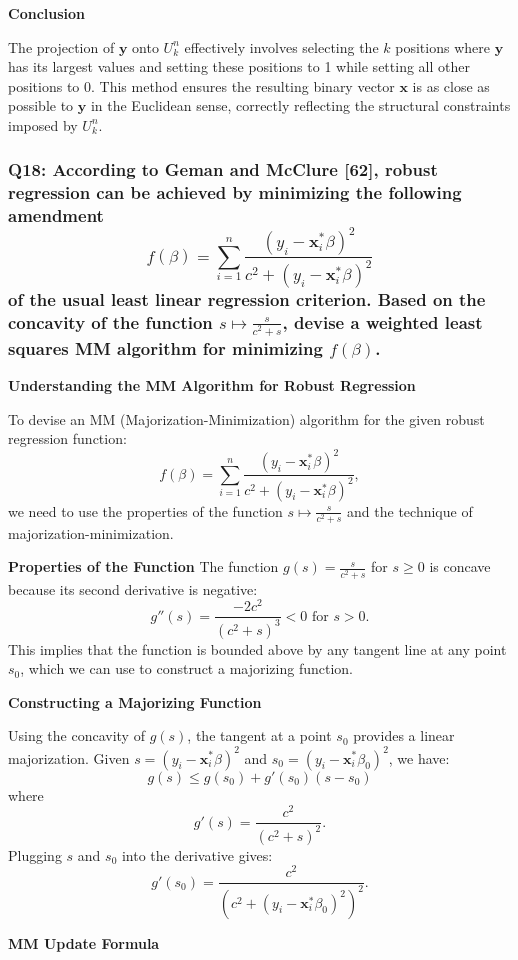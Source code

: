 \documentclass[8pt]{article}
\begin{document}
{\textbf{Conclusion}

The projection of \(\mathbf{y}\) onto \(U_k^n\) effectively involves selecting the \(k\) positions where \(\mathbf{y}\) has its largest values and setting these positions to 1 while setting all other positions to 0. This method ensures the resulting binary vector \(\mathbf{x}\) is as close as possible to \(\mathbf{y}\) in the Euclidean sense, correctly reflecting the structural constraints imposed by \( U_k^n \).


\subsubsection*{Q18: According to Geman and McClure [62], robust regression can be achieved by minimizing the following amendment
\[
f(\beta) = \sum_{i=1}^{n} \frac{(y_i - \mathbf{x}_i^* \beta)^2}{c^2 + (y_i - \mathbf{x}_i^* \beta)^2}
\]
of the usual least linear regression criterion. Based on the concavity of the function \(s \mapsto \frac{s}{c^2 + s}\), devise a weighted least squares MM algorithm for minimizing \(f(\beta)\).}

\textbf{Understanding the MM Algorithm for Robust Regression}

To devise an MM (Majorization-Minimization) algorithm for the given robust regression function:
\[ f(\beta) = \sum_{i=1}^{n} \frac{(y_i - \mathbf{x}_i^* \beta)^2}{c^2 + (y_i - \mathbf{x}_i^* \beta)^2}, \]
we need to use the properties of the function \(s \mapsto \frac{s}{c^2 + s}\) and the technique of majorization-minimization.

\textbf{Properties of the Function}
The function \(g(s) = \frac{s}{c^2 + s}\) for \(s \geq 0\) is concave because its second derivative is negative:
\[ g''(s) = \frac{-2c^2}{(c^2+s)^3} < 0 \text{ for } s > 0. \]
This implies that the function is bounded above by any tangent line at any point \(s_0\), which we can use to construct a majorizing function.

\textbf{Constructing a Majorizing Function}

Using the concavity of \(g(s)\), the tangent at a point \(s_0\) provides a linear majorization. Given \(s = (y_i - \mathbf{x}_i^* \beta)^2\) and \(s_0 = (y_i - \mathbf{x}_i^* \beta_0)^2\), we have:
\[ g(s) \leq g(s_0) + g'(s_0)(s-s_0) \]
where
\[ g'(s) = \frac{c^2}{(c^2 + s)^2}. \]
Plugging \(s\) and \(s_0\) into the derivative gives:
\[ g'(s_0) = \frac{c^2}{(c^2 + (y_i - \mathbf{x}_i^* \beta_0)^2)^2}. \]

\textbf{MM Update Formula}

}
\end{document}
